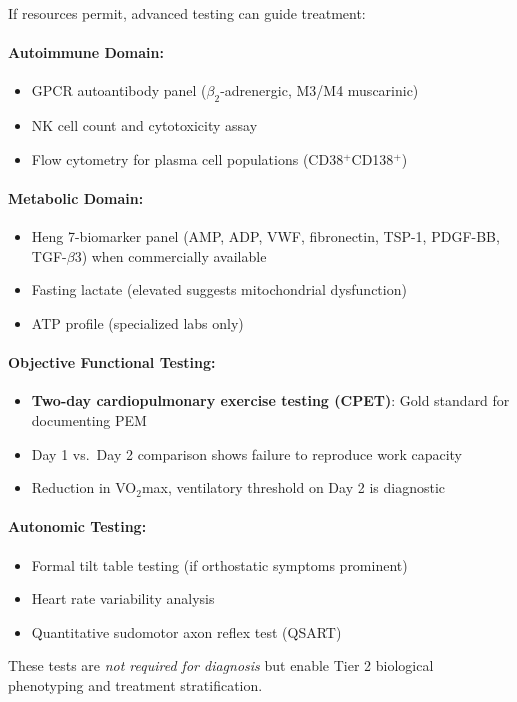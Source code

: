 \begin{observation}
\label{obs:advanced-biomarkers}
If resources permit, advanced testing can guide treatment:

\paragraph{Autoimmune Domain:}
\begin{itemize}
    \item GPCR autoantibody panel ($\beta_2$-adrenergic, M3/M4 muscarinic)
    \item NK cell count and cytotoxicity assay
    \item Flow cytometry for plasma cell populations (CD38$^+$CD138$^+$)
\end{itemize}

\paragraph{Metabolic Domain:}
\begin{itemize}
    \item Heng 7-biomarker panel (AMP, ADP, VWF, fibronectin, TSP-1, PDGF-BB, TGF-$\beta$3) when commercially available
    \item Fasting lactate (elevated suggests mitochondrial dysfunction)
    \item ATP profile (specialized labs only)
\end{itemize}

\paragraph{Objective Functional Testing:}
\begin{itemize}
    \item \textbf{Two-day cardiopulmonary exercise testing (CPET)}: Gold standard for documenting PEM
    \item Day 1 vs.\ Day 2 comparison shows failure to reproduce work capacity
    \item Reduction in VO$_2$max, ventilatory threshold on Day 2 is diagnostic
\end{itemize}

\paragraph{Autonomic Testing:}
\begin{itemize}
    \item Formal tilt table testing (if orthostatic symptoms prominent)
    \item Heart rate variability analysis
    \item Quantitative sudomotor axon reflex test (QSART)
\end{itemize}

These tests are \textit{not required for diagnosis} but enable Tier 2 biological phenotyping and treatment stratification.
\end{observation}


